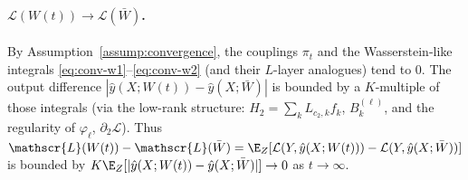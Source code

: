 \documentclass[nohyperref]{article}
\theoremstyle{plain}
\theoremstyle{definition}
\theoremstyle{remark}
\begin{document}
\paragraph{$\mathscr{L}(W(t))\to\mathscr{L}(\bar W)$.}
By Assumption~\ref{assump:convergence}, the couplings $\pi_t$ and the Wasserstein-like integrals \eqref{eq:conv-w1}--\eqref{eq:conv-w2} (and their $L$-layer analogues) tend to 0. The output difference $|\hat{y}(X;W(t))-\hat{y}(X;\bar W)|$ is bounded by a $K$-multiple of those integrals (via the low-rank structure: $H_2=\sum_k L_{c_2,k}f_k$, $B_k^{(\ell)}$, and the regularity of $\varphi_\ell$, $\partial_2\mathcal{L}$). Thus $\mathscr{L}(W(t))-\mathscr{L}(\bar W)=\E_Z[\mathcal{L}(Y,\hat{y}(X;W(t)))-\mathcal{L}(Y,\hat{y}(X;\bar W))]$ is bounded by $K\E_Z[|\hat{y}(X;W(t))-\hat{y}(X;\bar W)|]\to 0$ as $t\to\infty$.
\end{document}
